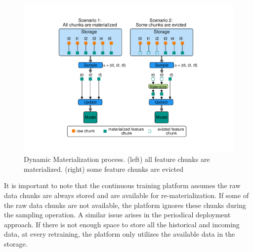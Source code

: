 \begin{figure}[h]
\centering
\includegraphics[width=\columnwidth]{../images/dynamic-materialization.pdf}
\caption{Dynamic Materialization process. (left) all feature chunks are materialized. (right) some feature chunks are evicted}
\label{fig:dynamic-materialization-process}
\end{figure}
It is important to note that the continuous training platform assumes the raw data chunks are always stored and are available for re-materialization.
If some of the raw data chunks are not available, the platform ignores these chunks during the sampling operation.
A similar issue arises in the periodical deployment approach.
If there is not enough space to store all the historical and incoming data, at every retraining, the platform only utilizes the available data in the storage.

